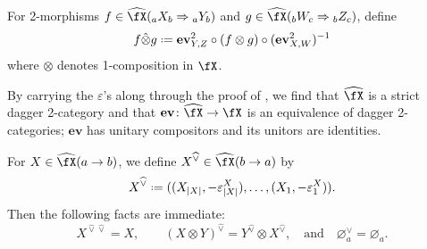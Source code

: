 \documentclass[12pt,reqno]{amsart}
\DeclareRobustCommand{\coloneq}{\mathrel{\vcenter{\baselineskip0.5ex\lineskiplimit0pt\hbox{\scriptsize{\upshape.}}\hbox{\scriptsize{\upshape.}}}}=}
\begin{document}
\begin{pf}
\begin{itemize}
For 2-morphisms $f\in\widehat{\fX}({}_aX_b\Rightarrow{}_aY_b)$ and $g\in\widehat{\fX}({}_bW_c\Rightarrow{}_bZ_c)$, define
\[
    f\hat\otimes g\coloneq\mathbf{ev}^2_{Y,Z}\circ(f\otimes g)\circ(\mathbf{ev}^2_{X,W})^{-1}
\]
where $\otimes$ denotes 1-composition in $\fX$.

\end{itemize}
By carrying the $\varepsilon$'s along through the proof of \cite[Prop. B.8]{Fer24}, we find that $\widehat{\fX}$ is a strict dagger 2-category and that $\mathbf{ev}\colon\widehat{\fX}\to\fX$ is an equivalence of dagger 2-categories; $\mathbf{ev}$ has unitary compositors and its unitors are identities.

For $X\in\widehat{\fX}(a\to b)$, we define $X^{\widehat\vee}\in\widehat{\fX}(b\to a)$ by
\[
X^{\widehat{\vee}}\coloneq((X_{|X|},-\varepsilon^X_{|X|}),\dots,(X_1,-\varepsilon^X_1)).
\]
Then the following facts are immediate:
\[
X^{\widehat{\vee}\widehat{\vee}}=X,
\qquad
(X\otimes Y)^{\widehat{\vee}}
=
Y^{\widehat{\vee}}\otimes X^{\widehat{\vee}},
\quad\text{and}\quad 
\varnothing_a^{\widehat{\vee}}=\varnothing_a.
\]


\end{pf}
\end{document}
